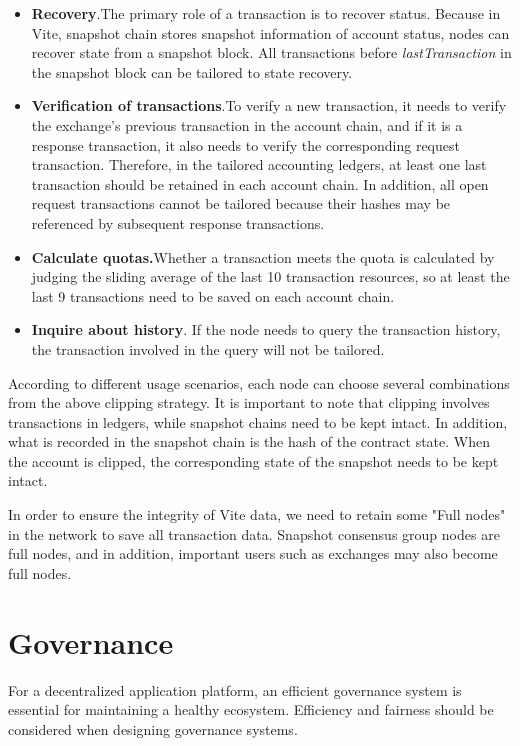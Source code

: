 \documentclass[UTF8,nofonts]{article}
\begin{document}
\begin{multicols}{2}
\begin{itemize}
\item \textbf{Recovery}.The primary role of a transaction is to recover status. Because in Vite, snapshot chain stores snapshot information of account status, nodes can recover state from a snapshot block. All transactions before \textit{lastTransaction} in the snapshot block can be tailored to state recovery.
\item \textbf{Verification of transactions}.To verify a new transaction, it needs to verify the exchange's previous transaction in the account chain, and if it is a response transaction, it also needs to verify the corresponding request transaction. Therefore, in the tailored accounting ledgers, at least one last transaction should be retained in each account chain. In addition, all open request transactions cannot be tailored because their hashes may be referenced by subsequent response transactions.
\item \textbf{Calculate quotas.}Whether a transaction meets the quota is calculated by judging the sliding average of the last 10 transaction resources, so at least the last 9 transactions need to be saved on each account chain.
\item \textbf{Inquire about history}. If the node needs to query the transaction history, the transaction involved in the query will not be tailored.
\end{itemize}

According to different usage scenarios, each node can choose several combinations from the above clipping strategy. It is important to note that clipping involves transactions in ledgers, while snapshot chains need to be kept intact. In addition, what is recorded in the snapshot chain is the hash of the contract state. When the account is clipped, the corresponding state of the snapshot needs to be kept intact.

In order to ensure the integrity of Vite data, we need to retain some "Full nodes" in the network to save all transaction data. Snapshot consensus group nodes are full nodes, and in addition, important users such as exchanges may also become full nodes.

\section{Governance}
For a decentralized application platform, an efficient governance system is essential for maintaining a healthy ecosystem. Efficiency and fairness should be considered when designing governance systems.


\end{multicols}
\end{document}
